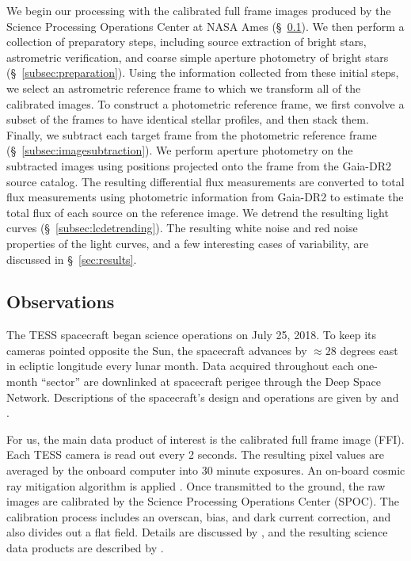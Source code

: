 \documentclass[12pt,twocolumn,tighten]{aastex62}
\begin{document}
We begin our processing with the calibrated full frame images produced
by the Science Processing Operations Center at NASA Ames
(\S~\ref{subsec:observations}).  We then perform a collection of
preparatory steps, including source extraction of bright stars,
astrometric verification, and coarse simple aperture photometry of
bright stars (\S~\ref{subsec:preparation}).  Using the information
collected from these initial steps, we select an astrometric reference
frame to which we transform all of the calibrated images. 
To construct a photometric reference frame,
we first convolve a subset of the frames to have identical stellar profiles,
and then stack them. Finally, we subtract each target frame
from the photometric reference frame (\S~\ref{subsec:imagesubtraction}).  We
perform aperture photometry on the subtracted images using positions
projected onto the frame from the Gaia-DR2 source catalog.  
The resulting differential flux measurements are converted to total flux measurements using photometric information from Gaia-DR2 to estimate the total flux of each source on the reference image.
We detrend
the resulting light curves (\S~\ref{subsec:lcdetrending}).  The
resulting white noise and red noise properties of the light curves,
and a few interesting cases of variability, are discussed in
\S~\ref{sec:results}.


\subsection{Observations}
\label{subsec:observations}


The TESS spacecraft began science operations on July 25, 2018.  To
keep its cameras pointed opposite the Sun, the spacecraft advances by
$\approx$$28$ degrees east in ecliptic longitude every lunar month.
Data acquired throughout each one-month ``sector'' are downlinked at spacecraft
perigee through the Deep Space Network.  Descriptions of the
spacecraft's design and operations are given by
\citet{ricker_transiting_2015} and
\citet{vanderspek_2018}.

For us, the main data product of interest is the calibrated full frame
image (FFI).  Each TESS camera is read out every 2 seconds.  
The resulting pixel values are
averaged by the onboard computer into 30 minute exposures. An on-board
cosmic ray mitigation algorithm is applied \citep[][\S
5.1]{vanderspek_2018}. Once transmitted to the ground, the raw images
are calibrated by the Science Processing Operations Center (SPOC).  The
calibration process includes an overscan, bias, and dark current
correction, and also divides out a flat field.  Details are discussed
by \citet{clarke_kepler_2017}, and the resulting science data products
are described by \citet{tess_data_product_description_2018}.
\end{document}
